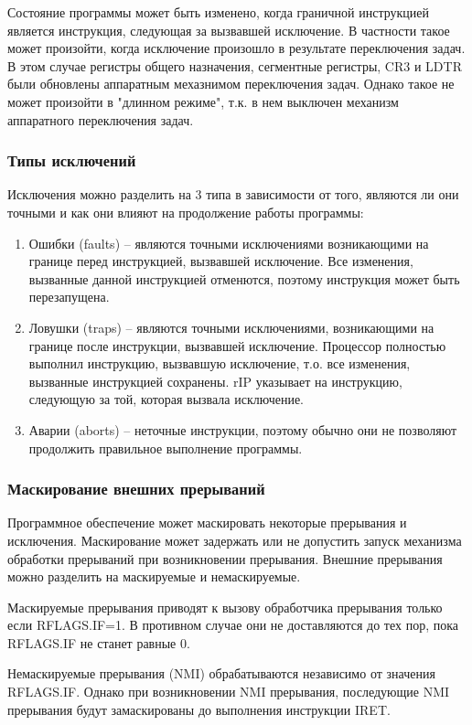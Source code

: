 Состояние программы может быть изменено, когда граничной инструкцией является
инструкция, следующая за вызвавшей исключение. В частности такое может
произойти, когда исключение произошло в результате переключения задач. В этом
случае регистры общего назначения, сегментные регистры, CR3 и LDTR были обновлены
аппаратным мехазнимом переключения задач. Однако такое не может произойти в
"длинном режиме", т.к. в нем выключен механизм аппаратного переключения задач.

\subsubsection*{Типы исключений}
Исключения можно разделить на 3 типа в зависимости от того, являются ли они
точными и как они влияют на продолжение работы программы:
\begin{enumerate}
\item Ошибки (faults) -- являются точными исключениями возникающими на границе перед
инструкцией, вызвавшей исключение. Все изменения, вызванные данной инструкцией
отменются, поэтому инструкция может быть перезапущена.
\item Ловушки (traps) -- являются точными исключениями, возникающими на границе после
инструкции, вызвавшей исключение. Процессор полностью выполнил инструкцию,
вызвавшую исключение, т.о. все изменения, вызванные инструкцией сохранены.
rIP указывает на инструкцию, следующую за той, которая вызвала исключение.
\item Аварии (aborts) -- неточные инструкции, поэтому обычно они не позволяют
продолжить правильное выполнение программы.
\end{enumerate}

\subsubsection*{Маскирование внешних прерываний}
Программное обеспечение может маскировать некоторые прерывания и исключения.
Маскирование может задержать или не допустить запуск механизма обработки
прерываний при возникновении прерывания. Внешние прерывания можно разделить на
маскируемые и немаскируемые.

Маскируемые прерывания приводят к вызову обработчика прерывания только если
RFLAGS.IF=1. В противном случае они не доставляются до тех пор, пока RFLAGS.IF
не станет равные 0.

Немаскируемые прерывания (NMI) обрабатываются независимо от значения RFLAGS.IF.
Однако при возникновении NMI прерывания, последующие NMI прерывания будут
замаскированы до выполнения инструкции IRET.

